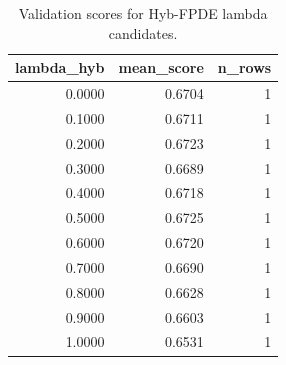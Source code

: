 \begin{table}[t]
\caption{Validation scores for Hyb-FPDE lambda candidates.}
\label{tab:lambda_distribution_computed}
\centering
\begin{tabular}{rrr}
\toprule
lambda\_hyb & mean\_score & n\_rows \\
\midrule
0.0000 & 0.6704 & 1 \\
0.1000 & 0.6711 & 1 \\
0.2000 & 0.6723 & 1 \\
0.3000 & 0.6689 & 1 \\
0.4000 & 0.6718 & 1 \\
0.5000 & 0.6725 & 1 \\
0.6000 & 0.6720 & 1 \\
0.7000 & 0.6690 & 1 \\
0.8000 & 0.6628 & 1 \\
0.9000 & 0.6603 & 1 \\
1.0000 & 0.6531 & 1 \\
\bottomrule
\end{tabular}

\end{table}

